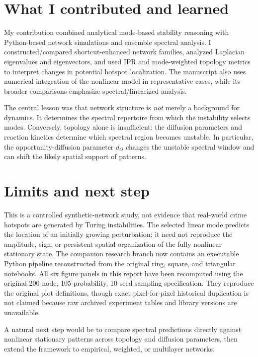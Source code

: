 \documentclass[10pt,letterpaper]{article}
\begin{document}
\newpage
\section*{What I contributed and learned}
My contribution combined analytical mode-based stability reasoning with Python-based network simulations and ensemble spectral analysis. I constructed/compared shortcut-enhanced network families, analyzed Laplacian eigenvalues and eigenvectors, and used IPR and mode-weighted topology metrics to interpret changes in potential hotspot localization. The manuscript also uses numerical integration of the nonlinear model in representative cases, while its broader comparisons emphasize spectral/linearized analysis.

The central lesson was that network structure is \emph{not} merely a background for dynamics. It determines the spectral repertoire from which the instability selects modes. Conversely, topology alone is insufficient: the diffusion parameters and reaction kinetics determine which spectral region becomes unstable. In particular, the opportunity-diffusion parameter $d_O$ changes the unstable spectral window and can shift the likely spatial support of patterns.

\section*{Limits and next step}
This is a controlled synthetic-network study, not evidence that real-world crime hotspots are generated by Turing instabilities. The selected linear mode predicts the location of an initially growing perturbation; it need not reproduce the amplitude, sign, or persistent spatial organization of the fully nonlinear stationary state. The companion research branch now contains an executable Python pipeline reconstructed from the original ring, square, and triangular notebooks. All six figure panels in this report have been recomputed using the original 200-node, 105-probability, 10-seed sampling specification. They reproduce the original plot definitions, though exact pixel-for-pixel historical duplication is not claimed because raw archived experiment tables and library versions are unavailable.

A natural next step would be to compare spectral predictions directly against nonlinear stationary patterns across topology and diffusion parameters, then extend the framework to empirical, weighted, or multilayer networks.
\end{document}
